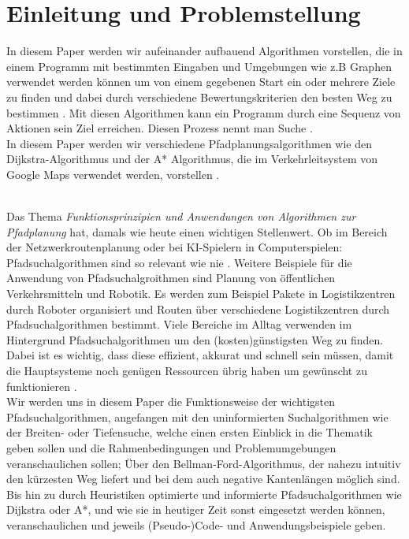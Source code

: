 
\chapter{Einleitung und Problemstellung}
\label{Einleitung und Problemstellung}


In diesem Paper werden wir aufeinander aufbauend Algorithmen vorstellen, die in einem Programm mit bestimmten Eingaben und Umgebungen 
wie z.B Graphen verwendet werden können um von einem gegebenen Start ein oder mehrere Ziele zu finden und dabei durch verschiedene Bewertungskriterien den besten Weg zu bestimmen \cite{Esri:00}.
Mit diesen Algorithmen kann ein Programm durch eine Sequenz von Aktionen sein Ziel erreichen. Diesen Prozess nennt man Suche \cite[150-156]{Russell:10}. \\


\noindent 
In diesem Paper werden wir verschiedene Pfadplanungsalgorithmen wie den Dijkstra-Algorithmus und der A* Algorithmus, 
die im Verkehrleitsystem von Google Maps verwendet werden, vorstellen \cite{Mehta:19}. 

\noindent \\
Das Thema \emph{Funktionsprinzipien und Anwendungen von Algorithmen zur Pfadplanung} hat, damals wie heute einen wichtigen Stellenwert. 
Ob im Bereich der Netzwerkroutenplanung oder bei KI-Spielern in Computerspielen: Pfadsuchalgorithmen sind so relevant wie nie \cite{Foeada:21}. 
Weitere Beispiele für die Anwendung von Pfadsuchalgroithmen sind Planung von öffentlichen Verkehrsmitteln und 
Robotik. Es werden zum Beispiel Pakete in Logistikzentren durch Roboter organisiert und Routen über verschiedene Logistikzentren durch Pfadsuchalgorithmen bestimmt.
Viele Bereiche im Alltag verwenden im Hintergrund Pfadsuchalgorithmen um den (kosten)günstigsten Weg zu finden. Dabei ist es wichtig, 
dass diese effizient, akkurat und schnell sein müssen, damit die Hauptsysteme noch genügen Ressourcen übrig haben um gewünscht zu funktionieren \cite{Foeada:21}. 
\noindent \\
Wir werden uns in diesem Paper die Funktionsweise der wichtigsten Pfadsuchalgorithmen, angefangen mit den uninformierten Suchalgorithmen wie der Breiten- oder Tiefensuche, 
welche einen ersten Einblick in die Thematik geben sollen und die Rahmenbedingungen und Problemumgebungen veranschaulichen sollen; 
Über den Bellman-Ford-Algorithmus, der nahezu intuitiv den kürzesten Weg liefert und bei dem auch negative Kantenlängen möglich sind\cite{Mukhlif:20}. 
Bis hin zu durch Heuristiken optimierte und informierte Pfadsuchalgorithmen wie Dijkstra oder A*, und wie sie in heutiger Zeit 
sonst eingesetzt werden können, veranschaulichen und jeweils (Pseudo-)Code- und Anwendungsbeispiele geben\cite[64]{Russell:10}.
